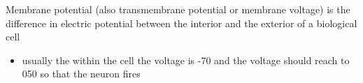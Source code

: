 \documentclass[a4paper]{article}
\title{}
\date{}
\author{Mohammad Rahmani}
\begin{document}
    \maketitle
    Membrane potential (also transmembrane potential or membrane voltage) is the difference in electric potential between the interior and the exterior of a biological cell 
    
    \begin{itemize}
        \item usually the within the cell the voltage is -70 and the voltage should reach to 050 so that the neuron fires
    \end{itemize}
    
    
\end{document}

